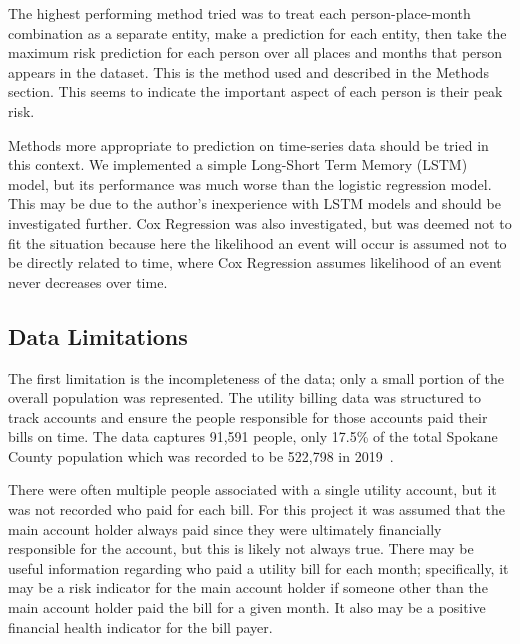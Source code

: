 \documentclass[10pt,letterpaper]{article}
\begin{document}
The highest performing method tried was to treat each person-place-month combination as a separate entity, make a prediction for each entity, then take the maximum risk prediction for each person over all places and months that person appears in the dataset. This is the method used and described in the Methods section. This seems to indicate the important aspect of each person is their peak risk. 

Methods more appropriate to prediction on time-series data should be tried in this context. We implemented a simple Long-Short Term Memory (LSTM) model, but its performance was much worse than the logistic regression model. This may be due to the author's inexperience with LSTM models and should be investigated further. Cox Regression was also investigated, but was deemed not to fit the situation because here the likelihood an event will occur is assumed not to be directly related to time, where Cox Regression assumes likelihood of an event never decreases over time.

\subsection*{Data Limitations}
The first limitation is the incompleteness of the data; only a small portion of the overall population was represented. The utility billing data was structured to track accounts and ensure the people responsible for those accounts paid their bills on time. The data captures 91,591 people, only 17.5\% of the total Spokane County population which was recorded to be 522,798 in 2019~\cite{SpokanePop}.

There were often multiple people associated with a single utility account, but it was not recorded who paid for each bill. For this project it was assumed that the main account holder always paid since they were ultimately financially responsible for the account, but this is likely not always true. There may be useful information regarding who paid a utility bill for each month; specifically, it may be a risk indicator for the main account holder if someone other than the main account holder paid the bill for a given month. It also may be a positive financial health indicator for the bill payer.
\end{document}
